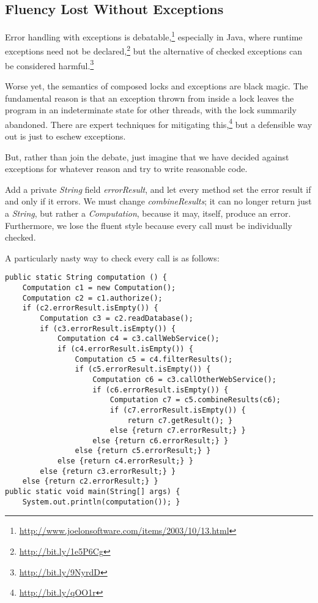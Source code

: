 \documentclass[11pt]{article}
\begin{document}
\subsection{Fluency Lost Without Exceptions}
\label{sec-2-3}

Error handling with exceptions is
debatable,\footnote{\url{http://www.joelonsoftware.com/items/2003/10/13.html}}
especially in Java, where runtime exceptions need not be
declared,\footnote{\url{http://bit.ly/1e5P6Cg}} but the alternative of checked
exceptions can be considered harmful.\footnote{\url{http://bit.ly/9NyrdD}}

Worse yet, the semantics of composed locks and exceptions are black
magic. The fundamental reason is that an exception thrown from
inside a lock leaves the program in an indeterminate state for
other threads, with the lock summarily abandoned. There are expert
techniques for mitigating this,\footnote{\url{http://bit.ly/qOO1r}} but a
defensible way out is just to eschew exceptions.

But, rather than join the debate, just imagine that we have decided
against exceptions for whatever reason and try to write reasonable
code.

Add a private \emph{String} field \emph{errorResult}, and let every method
set the error result if and only if it errors. We must change
\emph{combineResults}; it can no longer return just a \emph{String}, but
rather a \emph{Computation}, because it may, itself, produce an error.
Furthermore, we lose the fluent style because every call must be
individually checked.

A particularly nasty way to check every call is as follows:
\begin{verbatim}
public static String computation () {
    Computation c1 = new Computation();
    Computation c2 = c1.authorize();
    if (c2.errorResult.isEmpty()) {
        Computation c3 = c2.readDatabase();
        if (c3.errorResult.isEmpty()) {
            Computation c4 = c3.callWebService();
            if (c4.errorResult.isEmpty()) {
                Computation c5 = c4.filterResults();
                if (c5.errorResult.isEmpty()) {
                    Computation c6 = c3.callOtherWebService();
                    if (c6.errorResult.isEmpty()) {
                        Computation c7 = c5.combineResults(c6);
                        if (c7.errorResult.isEmpty()) {
                            return c7.getResult(); }
                        else {return c7.errorResult;} }
                    else {return c6.errorResult;} }
                else {return c5.errorResult;} }
            else {return c4.errorResult;} }
        else {return c3.errorResult;} }
    else {return c2.errorResult;} }
public static void main(String[] args) {
    System.out.println(computation()); }
\end{verbatim}
\end{document}
